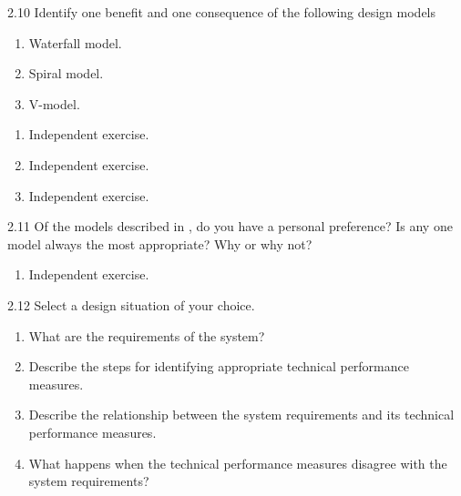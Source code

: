 \begin{exsol@exercise}{2.10}
    \label{sea-2-14}
        Identify one benefit and one consequence of the following design models
        \begin{enumerate}[label=\alph*)]
            \item Waterfall model.
            \item Spiral model.
            \item V-model.
        \end{enumerate}
\end{exsol@exercise}
\begin{exsol@solution}{}
        \begin{enumerate}[label=\alph*)]
            \item Independent exercise.
            \item Independent exercise.
            \item Independent exercise.
        \end{enumerate}
\end{exsol@solution}
\begin{exsol@exercise}{2.11}
    \label{sea-2-14_part2}
        Of the models described in , do you have a personal preference? Is any one model always the most appropriate? Why or why not?
\end{exsol@exercise}
\begin{exsol@solution}{}
        \begin{enumerate}[label=\alph*)]
            \item Independent exercise.
        \end{enumerate}
\end{exsol@solution}
\begin{exsol@exercise}{2.12}
    \label{sea-2-15_16}
        Select a design situation of your choice.
        \begin{enumerate}[label=\alph*)]
            \item What are the requirements of the system?
            \item Describe the steps for identifying appropriate technical performance measures.
            \item Describe the relationship between the system requirements and its technical performance measures.
            \item What happens when the technical performance measures disagree with the system requirements?
        \end{enumerate}
\end{exsol@exercise}
